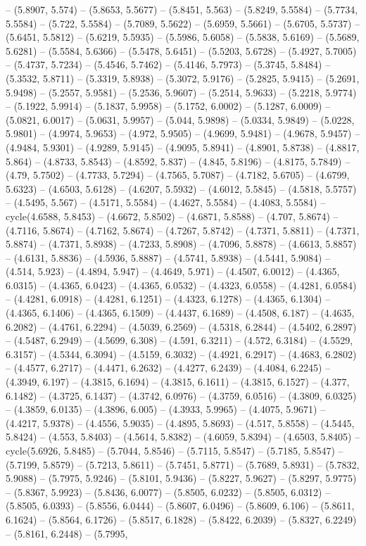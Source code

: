 -- (5.8907, 5.574) -- (5.8653, 5.5677) -- (5.8451, 5.563) -- (5.8249, 5.5584) -- (5.7734, 5.5584) -- (5.722, 5.5584) -- (5.7089, 5.5622) -- (5.6959, 5.5661) -- (5.6705, 5.5737) -- (5.6451, 5.5812) -- (5.6219, 5.5935) -- (5.5986, 5.6058) -- (5.5838, 5.6169) -- (5.5689, 5.6281) -- (5.5584, 5.6366) -- (5.5478, 5.6451) -- (5.5203, 5.6728) -- (5.4927, 5.7005) -- (5.4737, 5.7234) -- (5.4546, 5.7462) -- (5.4146, 5.7973) -- (5.3745, 5.8484) -- (5.3532, 5.8711) -- (5.3319, 5.8938) -- (5.3072, 5.9176) -- (5.2825, 5.9415) -- (5.2691, 5.9498) -- (5.2557, 5.9581) -- (5.2536, 5.9607) -- (5.2514, 5.9633) -- (5.2218, 5.9774) -- (5.1922, 5.9914) -- (5.1837, 5.9958) -- (5.1752, 6.0002) -- (5.1287, 6.0009) -- (5.0821, 6.0017) -- (5.0631, 5.9957) -- (5.044, 5.9898) -- (5.0334, 5.9849) -- (5.0228, 5.9801) -- (4.9974, 5.9653) -- (4.972, 5.9505) -- (4.9699, 5.9481) -- (4.9678, 5.9457) -- (4.9484, 5.9301) -- (4.9289, 5.9145) -- (4.9095, 5.8941) -- (4.8901, 5.8738) -- (4.8817, 5.864) -- (4.8733, 5.8543) -- (4.8592, 5.837) -- (4.845, 5.8196) -- (4.8175, 5.7849) -- (4.79, 5.7502) -- (4.7733, 5.7294) -- (4.7565, 5.7087) -- (4.7182, 5.6705) -- (4.6799, 5.6323) -- (4.6503, 5.6128) -- (4.6207, 5.5932) -- (4.6012, 5.5845) -- (4.5818, 5.5757) -- (4.5495, 5.567) -- (4.5171, 5.5584) -- (4.4627, 5.5584) -- (4.4083, 5.5584) -- cycle(4.6588, 5.8453) -- (4.6672, 5.8502) -- (4.6871, 5.8588) -- (4.707, 5.8674) -- (4.7116, 5.8674) -- (4.7162, 5.8674) -- (4.7267, 5.8742) -- (4.7371, 5.8811) -- (4.7371, 5.8874) -- (4.7371, 5.8938) -- (4.7233, 5.8908) -- (4.7096, 5.8878) -- (4.6613, 5.8857) -- (4.6131, 5.8836) -- (4.5936, 5.8887) -- (4.5741, 5.8938) -- (4.5441, 5.9084) -- (4.514, 5.923) -- (4.4894, 5.947) -- (4.4649, 5.971) -- (4.4507, 6.0012) -- (4.4365, 6.0315) -- (4.4365, 6.0423) -- (4.4365, 6.0532) -- (4.4323, 6.0558) -- (4.4281, 6.0584) -- (4.4281, 6.0918) -- (4.4281, 6.1251) -- (4.4323, 6.1278) -- (4.4365, 6.1304) -- (4.4365, 6.1406) -- (4.4365, 6.1509) -- (4.4437, 6.1689) -- (4.4508, 6.187) -- (4.4635, 6.2082) -- (4.4761, 6.2294) -- (4.5039, 6.2569) -- (4.5318, 6.2844) -- (4.5402, 6.2897) -- (4.5487, 6.2949) -- (4.5699, 6.308) -- (4.591, 6.3211) -- (4.572, 6.3184) -- (4.5529, 6.3157) -- (4.5344, 6.3094) -- (4.5159, 6.3032) -- (4.4921, 6.2917) -- (4.4683, 6.2802) -- (4.4577, 6.2717) -- (4.4471, 6.2632) -- (4.4277, 6.2439) -- (4.4084, 6.2245) -- (4.3949, 6.197) -- (4.3815, 6.1694) -- (4.3815, 6.1611) -- (4.3815, 6.1527) -- (4.377, 6.1482) -- (4.3725, 6.1437) -- (4.3742, 6.0976) -- (4.3759, 6.0516) -- (4.3809, 6.0325) -- (4.3859, 6.0135) -- (4.3896, 6.005) -- (4.3933, 5.9965) -- (4.4075, 5.9671) -- (4.4217, 5.9378) -- (4.4556, 5.9035) -- (4.4895, 5.8693) -- (4.517, 5.8558) -- (4.5445, 5.8424) -- (4.553, 5.8403) -- (4.5614, 5.8382) -- (4.6059, 5.8394) -- (4.6503, 5.8405) -- cycle(5.6926, 5.8485) -- (5.7044, 5.8546) -- (5.7115, 5.8547) -- (5.7185, 5.8547) -- (5.7199, 5.8579) -- (5.7213, 5.8611) -- (5.7451, 5.8771) -- (5.7689, 5.8931) -- (5.7832, 5.9088) -- (5.7975, 5.9246) -- (5.8101, 5.9436) -- (5.8227, 5.9627) -- (5.8297, 5.9775) -- (5.8367, 5.9923) -- (5.8436, 6.0077) -- (5.8505, 6.0232) -- (5.8505, 6.0312) -- (5.8505, 6.0393) -- (5.8556, 6.0444) -- (5.8607, 6.0496) -- (5.8609, 6.106) -- (5.8611, 6.1624) -- (5.8564, 6.1726) -- (5.8517, 6.1828) -- (5.8422, 6.2039) -- (5.8327, 6.2249) -- (5.8161, 6.2448) -- (5.7995, 